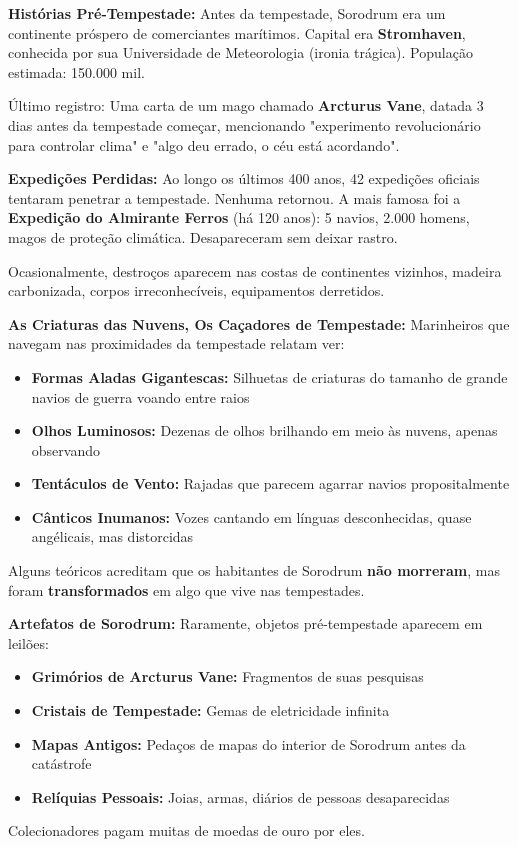 \textbf{\ringmfamily Histórias Pré-Tempestade:}
Antes da tempestade, Sorodrum era um continente próspero de comerciantes marítimos. Capital era \textbf{Stromhaven}, conhecida por sua Universidade de Meteorologia (ironia trágica). População estimada: 150.000 mil.

Último registro: Uma carta de um mago chamado \textbf{Arcturus Vane}, datada 3 dias antes da tempestade começar, mencionando "experimento revolucionário para controlar clima" e "algo deu errado, o céu está acordando".

\textbf{\ringmfamily Expedições Perdidas:}
Ao longo os últimos 400 anos, 42 expedições oficiais tentaram penetrar a tempestade. Nenhuma retornou. A mais famosa foi a \textbf{Expedição do Almirante Ferros} (há 120 anos): 5 navios, 2.000 homens, magos de proteção climática. Desapareceram sem deixar rastro.

Ocasionalmente, destroços aparecem nas costas de continentes vizinhos, madeira carbonizada, corpos irreconhecíveis, equipamentos derretidos.

\textbf{\ringmfamily As Criaturas das Nuvens, Os Caçadores de Tempestade:}
Marinheiros que navegam nas proximidades da tempestade relatam ver:
\begin{itemize}
    \item \textbf{Formas Aladas Gigantescas:} Silhuetas de criaturas do tamanho de grande navios de guerra voando entre raios
    \item \textbf{Olhos Luminosos:} Dezenas de olhos brilhando em meio às nuvens, apenas observando
    \item \textbf{Tentáculos de Vento:} Rajadas que parecem agarrar navios propositalmente
    \item \textbf{Cânticos Inumanos:} Vozes cantando em línguas desconhecidas, quase angélicais, mas distorcidas
\end{itemize}
Alguns teóricos acreditam que os habitantes de Sorodrum \textbf{não morreram}, mas foram \textbf{transformados} em algo que vive nas tempestades.

\textbf{\ringmfamily Artefatos de Sorodrum:}
Raramente, objetos pré-tempestade aparecem em leilões:
\begin{itemize}
    \item \textbf{Grimórios de Arcturus Vane:} Fragmentos de suas pesquisas
    \item \textbf{Cristais de Tempestade:} Gemas de eletricidade infinita
    \item \textbf{Mapas Antigos:} Pedaços de mapas do interior de Sorodrum antes da catástrofe
    \item \textbf{Relíquias Pessoais:} Joias, armas, diários de pessoas desaparecidas
\end{itemize}
Colecionadores pagam muitas de moedas de ouro por eles.

